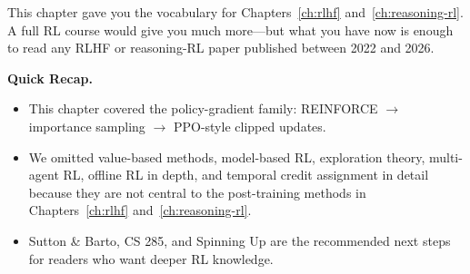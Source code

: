 This chapter gave you the vocabulary for Chapters~\ref{ch:rlhf} and~\ref{ch:reasoning-rl}. A full RL course would give you much more---but what you have now is enough to read any RLHF or reasoning-RL paper published between 2022 and 2026.

\begin{quickrecap}
\textbf{Quick Recap.}
\begin{itemize}[nosep,leftmargin=1.5em]
  \item This chapter covered the policy-gradient family: REINFORCE $\to$ importance sampling $\to$ PPO-style clipped updates.
  \item We omitted value-based methods, model-based RL, exploration theory, multi-agent RL, offline RL in depth, and temporal credit assignment in detail because they are not central to the post-training methods in Chapters~\ref{ch:rlhf} and~\ref{ch:reasoning-rl}.
  \item Sutton \& Barto, CS 285, and Spinning Up are the recommended next steps for readers who want deeper RL knowledge.
\end{itemize}
\end{quickrecap}



